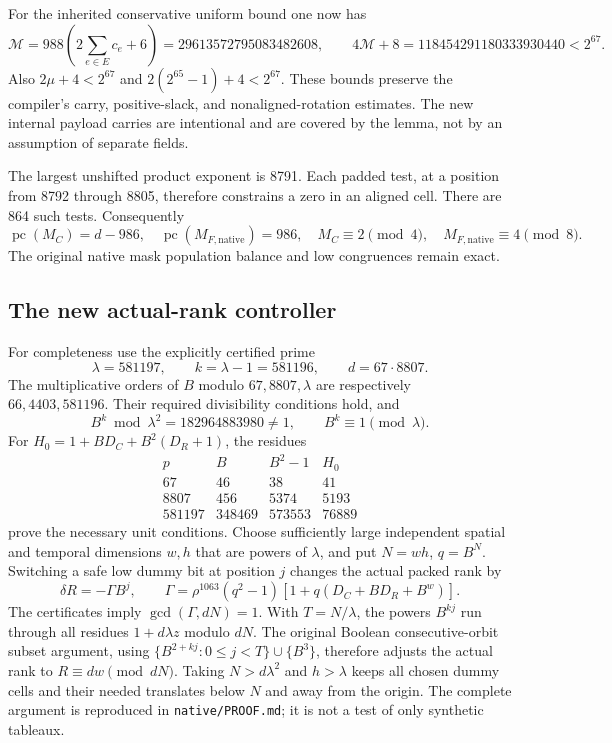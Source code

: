 For the inherited conservative uniform bound one now has
\[
 \mathcal M=988\left(2\sum_{e\in E}c_e+6\right)
 =29613572795083482608,
 \qquad
 4\mathcal M+8=118454291180333930440<2^{67}.
\]
Also $2\mu+4<2^{67}$ and $2(2^{65}-1)+4<2^{67}$.  These bounds
preserve the compiler's carry, positive-slack, and nonaligned-rotation
estimates.  The new internal payload carries are intentional and are
covered by the lemma, not by an assumption of separate fields.

The largest unshifted product exponent is 8791.  Each padded test, at a
position from 8792 through 8805, therefore constrains a zero in an aligned
cell.  There are 864 such tests.  Consequently
\[
 \operatorname{pc}(M_C)=d-986,\quad
 \operatorname{pc}(M_{F,\mathrm{native}})=986,
 \quad M_C\equiv2\pmod4,\quad
 M_{F,\mathrm{native}}\equiv4\pmod8.
\]
The original native mask population balance and low congruences remain exact.

\subsection{The new actual-rank controller}
For completeness use the explicitly certified prime
\[
 \lambda=581197,\qquad k=\lambda-1=581196,
 \qquad d=67\cdot8807.
\]
The multiplicative orders of $B$ modulo $67,8807,\lambda$ are respectively
$66,4403,581196$.  Their required divisibility conditions hold, and
\[
 B^k\bmod\lambda^2=182964883980\ne1,
 \qquad B^k\equiv1\pmod\lambda.
\]
For $H_0=1+BD_C+B^2(D_R+1)$, the residues
\[
\begin{array}{c|rrr}
p&B&B^2-1&H_0\\\hline
67&46&38&41\\
8807&456&5374&5193\\
581197&348469&573553&76889
\end{array}
\]
prove the necessary unit conditions.  Choose sufficiently large independent
spatial and temporal dimensions $w,h$ that are powers of $\lambda$,
and put $N=wh$, $q=B^N$.  Switching a safe low dummy bit at position $j$
changes the actual packed rank by
\[
 \delta R=-\Gamma B^j,\qquad
 \Gamma=\rho^{1063}(q^2-1)[1+q(D_C+BD_R+B^w)].
\]
The certificates imply $\gcd(\Gamma,dN)=1$.  With $T=N/\lambda$,
the powers $B^{kj}$ run through all residues $1+d\lambda z$ modulo
$dN$.  The original Boolean consecutive-orbit subset argument, using
$\{B^{2+kj}:0\le j<T\}\cup\{B^3\}$, therefore adjusts the actual
rank to $R\equiv dw\pmod{dN}$.  Taking $N>d\lambda^2$ and $h>\lambda$
keeps all chosen dummy cells and their needed translates below $N$ and
away from the origin.  The complete argument is reproduced in
\texttt{native/PROOF.md}; it is not a test of only synthetic tableaux.

